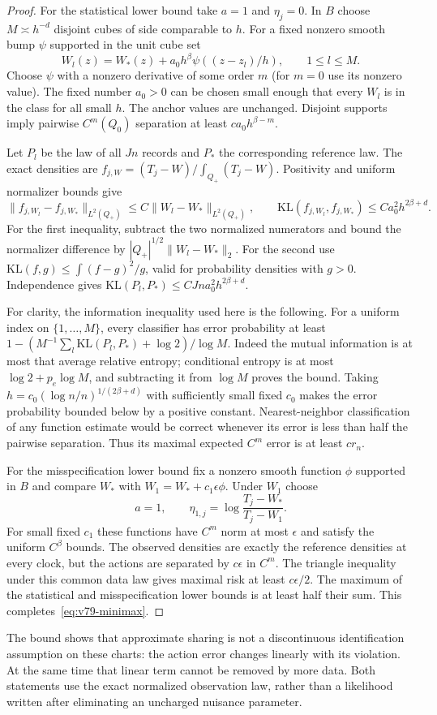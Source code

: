 \begin{proof}
For the statistical lower bound take $a=1$ and $\eta_j=0$.  In $B$
choose $M\asymp h^{-d}$ disjoint cubes of side comparable to $h$.
For a fixed nonzero smooth bump $\psi$ supported in the unit cube set
\[
 W_l(z)=W_*(z)+a_0h^\beta\psi((z-z_l)/h),
                  \qquad 1\le l\le M.
\]
Choose $\psi$ with a nonzero derivative of some order $m$ (for $m=0$
use its nonzero value).  The fixed number $a_0>0$ can be chosen small
enough that every $W_l$ is in the class for all small $h$.  The anchor
values are unchanged.  Disjoint supports imply pairwise $C^m(Q_0)$
separation at least $c a_0h^{\beta-m}$.

Let $P_l$ be the law of all $Jn$ records and $P_*$ the corresponding
reference law.  The exact densities are
$f_{j,W}=(T_j-W)/\int_{Q_+}(T_j-W)$.  Positivity and uniform
normalizer bounds give
\[
 \|f_{j,W_l}-f_{j,W_*}\|_{L^2(Q_+)}
                 \le C\|W_l-W_*\|_{L^2(Q_+)},
 \qquad
 \mathrm{KL}(f_{j,W_l},f_{j,W_*})
                 \le C a_0^2h^{2\beta+d}.
\]
For the first inequality, subtract the two normalized numerators and
bound the normalizer difference by
$|Q_+|^{1/2}\|W_l-W_*\|_2$.  For the second use
$\mathrm{KL}(f,g)\le\int(f-g)^2/g$, valid for probability densities
with $g>0$.  Independence gives
$\mathrm{KL}(P_l,P_*)\le C Jn a_0^2h^{2\beta+d}$.

For clarity, the information inequality used here is the following.
For a uniform index on $\{1,\ldots,M\}$, every classifier has error
probability at least
$1-(M^{-1}\sum_l\mathrm{KL}(P_l,P_*)+\log2)/\log M$.
Indeed the mutual information is at most that average relative entropy;
conditional entropy is at most $\log2+p_e\log M$, and subtracting it
from $\log M$ proves the bound.  Taking
$h=c_0(\log n/n)^{1/(2\beta+d)}$ with sufficiently small fixed $c_0$
makes the error probability bounded below by a positive constant.
Nearest-neighbor classification of any function estimate would be
correct whenever its error is less than half the pairwise separation.
Thus its maximal expected $C^m$ error is at least $c r_n$.

For the misspecification lower bound fix a nonzero smooth function
$\phi$ supported in $B$ and compare $W_*$ with
$W_1=W_*+c_1\epsilon\phi$.  Under $W_1$ choose
\[
 a=1,\qquad
 \eta_{1,j}=\log\frac{T_j-W_*}{T_j-W_1}.
\]
For small fixed $c_1$ these functions have $C^m$ norm at most
$\epsilon$ and satisfy the uniform $C^\beta$ bounds.  The observed
densities are exactly the reference densities at every clock, but the
actions are separated by $c\epsilon$ in $C^m$.  The triangle inequality
under this common data law gives maximal risk at least $c\epsilon/2$.
The maximum of the statistical and misspecification lower bounds is
at least half their sum.  This completes~\eqref{eq:v79-minimax}.
\end{proof}

The bound shows that approximate sharing is not a discontinuous
identification assumption on these charts: the action error changes
linearly with its violation.  At the same time that linear term cannot
be removed by more data.  Both statements use the exact normalized
observation law, rather than a likelihood written after eliminating
an uncharged nuisance parameter.
